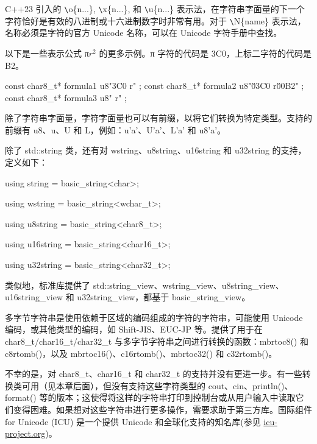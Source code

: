 C++23 引入的 \verb|\|o\{n...\}, \verb|\|x\{n...\}, 和 \verb|\|u\{n...\} 表示法，在字符串字面量的下一个字符恰好是有效的八进制或十六进制数字时非常有用。对于 \verb|\|N\{name\} 表示法，名称必须是字符的官方 Unicode 名称，可以在 Unicode 字符手册中查找。

以下是一些表示公式 π$r^2$ 的更多示例。π 字符的代码是 3C0，上标二字符的代码是 B2。

\begin{cpp}
const char8_t* formula1 { u8"\x3C0 r" };
const char8_t* formula2 { u8"\u03C0 r\u00B2" };
const char8_t* formula3 { u8" r" };
\end{cpp}

除了字符串字面量，字符字面量也可以有前缀，以将它们转换为特定类型。支持的前缀有 u8、u、U 和 L，例如：u'a'、U'a'、L'a' 和 u8'a'。

除了 std::string 类，还有对 wstring、u8string、u16string 和 u32string 的支持，定义如下：

\begin{cpp}
using string = basic_string<char>;
\end{cpp}

\begin{cpp}
using wstring = basic_string<wchar_t>;
\end{cpp}

\begin{cpp}
using u8string = basic_string<char8_t>;
\end{cpp}

\begin{cpp}
using u16string = basic_string<char16_t>;
\end{cpp}

\begin{cpp}
using u32string = basic_string<char32_t>;
\end{cpp}

类似地，标准库提供了 std::string\_view、wstring\_view、u8string\_view、u16string\_view 和 u32string\_view，都基于 basic\_string\_view。

多字节字符串是使用依赖于区域的编码组成的字符的字符串，可能使用 Unicode 编码，或其他类型的编码，如 Shift-JIS、EUC-JP 等。提供了用于在 char8\_t/char16\_t/char32\_t 与多字节字符串之间进行转换的函数：mbrtoc8() 和 c8rtomb()，以及 mbrtoc16()、c16rtomb()、mbrtoc32() 和 c32rtomb()。

不幸的是，对 char8\_t、char16\_t 和 char32\_t 的支持并没有更进一步。有一些转换类可用（见本章后面），但没有支持这些字符类型的 cout、cin、println()、format() 等的版本；这使得将这样的字符串打印到控制台或从用户输入中读取它们变得困难。如果想对这些字符串进行更多操作，需要求助于第三方库。国际组件 for Unicode (ICU) 是一个提供 Unicode 和全球化支持的知名库(参见 \url{icu-project.org})。

